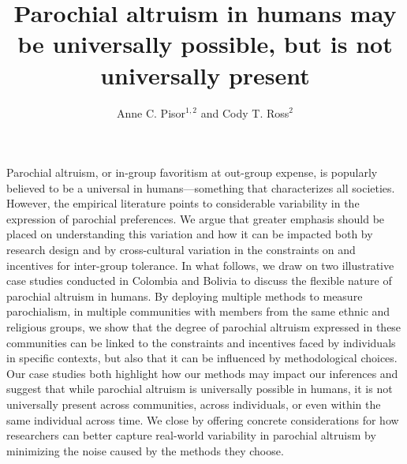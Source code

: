 \documentclass[bibauthoryear]{aa}
\begin{document}
 


   \title{Parochial altruism in humans may be universally possible, but is not universally present}

\author{%
Anne C. Pisor$^{1,2}$ and Cody T. Ross$^{2}$
}

   \date{}

 
  \abstract
 {
Parochial altruism, or in-group favoritism at out-group expense, is popularly believed to be a universal in humans---something that characterizes all societies. However, the empirical literature points to considerable variability in the expression of parochial preferences. We argue that greater emphasis should be placed on understanding this variation and how it can be impacted both by research design and by cross-cultural variation in the constraints on and incentives for inter-group tolerance. In what follows, we draw on two illustrative case studies conducted in Colombia and Bolivia to discuss the flexible nature of parochial altruism in humans. By deploying multiple methods to measure parochialism, in multiple communities with members from the same ethnic and religious groups, we show that the degree of parochial altruism expressed in these communities can be linked to the constraints and incentives faced by individuals in specific contexts, but also that it can be influenced by methodological choices. Our case studies both highlight how our methods may impact our inferences and suggest that while parochial altruism is universally possible in humans, it is not universally present across communities, across individuals, or even within the same individual across time. We close by offering concrete considerations for how researchers can better capture real-world variability in parochial altruism by minimizing the noise caused by the methods they choose.
 }

               
               \titlerunning{~}
\authorrunning{~  }%

   \maketitle
%
\end{document}
